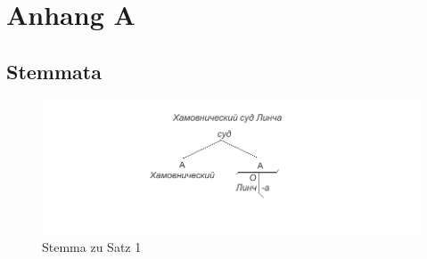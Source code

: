 
\cleardoublepage
{}
\newpage
\abstand
\section*{Anhang A}
\label{sec:anhang_a}

\subsection*{Stemmata}
\label{subsec:anhang:a:stemmata}

\begin{figure}[h]
    \begin{center}
        \includegraphics{anhang_a/stemma1}
        \caption{Stemma zu Satz 1}
        \label{fig:stemma1}
    \end{center}
\end{figure}

